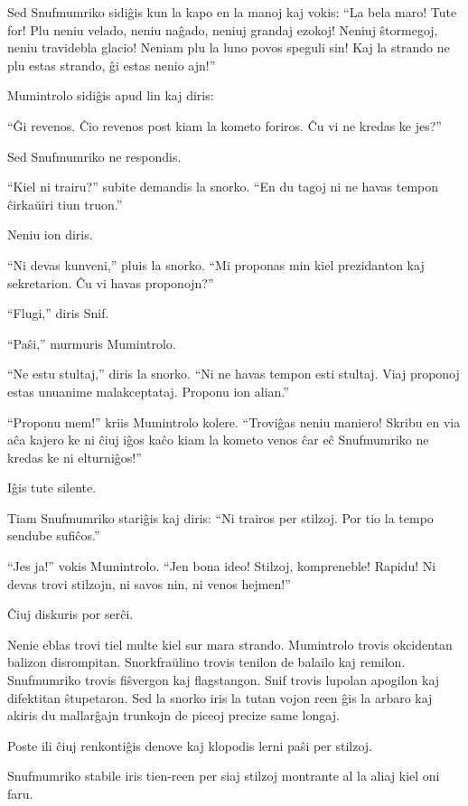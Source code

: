 Sed Snufmumriko sidiĝis kun la kapo en la manoj kaj vokis: ``La bela maro! Tute for! Plu neniu velado, neniu naĝado, neniuj grandaj ezokoj! Neniuj ŝtormegoj, neniu travidebla glacio! Neniam plu la luno povos speguli sin! Kaj la strando ne plu estas strando, ĝi estas nenio ajn!''

Mumintrolo sidiĝis apud lin kaj diris:

``Ĝi revenos. Ĉio revenos post kiam la kometo foriros. Ĉu vi ne kredas ke jes?''

Sed Snufmumriko ne respondis.

``Kiel ni trairu?'' subite demandis la snorko. ``En du tagoj ni ne havas tempon ĉirkaŭiri tiun truon.''

Neniu ion diris.

``Ni devas kunveni,'' pluis la snorko. ``Mi proponas min kiel prezidanton kaj sekretarion. Ĉu vi havas proponojn?''

``Flugi,'' diris Snif.

``Paŝi,'' murmuris Mumintrolo.

``Ne estu stultaj,'' diris la snorko. ``Ni ne havas tempon esti stultaj. Viaj proponoj estas unuanime malakceptataj. Proponu ion alian.''

``Proponu mem!'' kriis Mumintrolo kolere. ``Troviĝas neniu maniero! Skribu en via aĉa kajero ke ni ĉiuj iĝos kaĉo kiam la kometo venos ĉar eĉ Snufmumriko ne kredas ke ni elturniĝos!''

Iĝis tute silente.

Tiam Snufmumriko stariĝis kaj diris: ``Ni trairos per stilzoj. Por tio la tempo sendube sufiĉos.''

``Jes ja!'' vokis Mumintrolo. ``Jen bona ideo! Stilzoj, kompreneble! Rapidu! Ni devas trovi stilzojn, ni savos nin, ni venos hejmen!''

Ĉiuj diskuris por serĉi.

Nenie eblas trovi tiel multe kiel sur mara strando. Mumintrolo trovis okcidentan balizon disrompitan. Snorkfraŭlino trovis tenilon de balailo kaj remilon. Snufmumriko trovis fiŝvergon kaj flagstangon. Snif trovis lupolan apogilon kaj difektitan ŝtupetaron. Sed la snorko iris la tutan vojon reen ĝis la arbaro kaj akiris du mallarĝajn trunkojn de piceoj precize same longaj.

Poste ili ĉiuj renkontiĝis denove kaj klopodis lerni paŝi per stilzoj.

Snufmumriko stabile iris tien-reen per siaj stilzoj montrante al la aliaj kiel oni faru.

